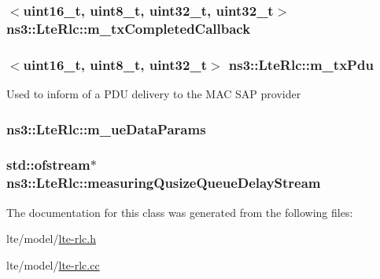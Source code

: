 \subsubsection[{\texorpdfstring{m\+\_\+tx\+Completed\+Callback}{m_txCompletedCallback}}]{$<$uint16\+\_\+t, uint8\+\_\+t, uint32\+\_\+t, uint32\+\_\+t$>$ ns3\+::\+Lte\+Rlc\+::m\+\_\+tx\+Completed\+Callback\hspace{0.3cm}{\ttfamily [protected]}}\hypertarget{classns3_1_1LteRlc_aa6cf9c6ecdd5efc7dacb99d4042037d9}{}\label{classns3_1_1LteRlc_aa6cf9c6ecdd5efc7dacb99d4042037d9}
\subsubsection[{\texorpdfstring{m\+\_\+tx\+Pdu}{m_txPdu}}]{$<$uint16\+\_\+t, uint8\+\_\+t, uint32\+\_\+t$>$ ns3\+::\+Lte\+Rlc\+::m\+\_\+tx\+Pdu\hspace{0.3cm}{\ttfamily [protected]}}\hypertarget{classns3_1_1LteRlc_aa14f9d8b8828d0b0859f1870ae1248e6}{}\label{classns3_1_1LteRlc_aa14f9d8b8828d0b0859f1870ae1248e6}
Used to inform of a P\+DU delivery to the M\+AC S\+AP provider 
\subsubsection[{\texorpdfstring{m\+\_\+ue\+Data\+Params}{m_ueDataParams}}]{ ns3\+::\+Lte\+Rlc\+::m\+\_\+ue\+Data\+Params\hspace{0.3cm}{\ttfamily [protected]}}\hypertarget{classns3_1_1LteRlc_a6f4d5d0a7f8d3dd3c35a5fc0598ea3b8}{}\label{classns3_1_1LteRlc_a6f4d5d0a7f8d3dd3c35a5fc0598ea3b8}
\subsubsection[{\texorpdfstring{measuring\+Qusize\+Queue\+Delay\+Stream}{measuringQusizeQueueDelayStream}}]{\setlength{\rightskip}{0pt plus 5cm}std\+::ofstream$\ast$ ns3\+::\+Lte\+Rlc\+::measuring\+Qusize\+Queue\+Delay\+Stream\hspace{0.3cm}{\ttfamily [protected]}}\hypertarget{classns3_1_1LteRlc_a40a539b080df8c617ca62325696cfe20}{}\label{classns3_1_1LteRlc_a40a539b080df8c617ca62325696cfe20}


The documentation for this class was generated from the following files\+:\begin{DoxyCompactItemize}
\item 
lte/model/\hyperlink{lte-rlc_8h}{lte-\/rlc.\+h}\item 
lte/model/\hyperlink{lte-rlc_8cc}{lte-\/rlc.\+cc}\end{DoxyCompactItemize}
